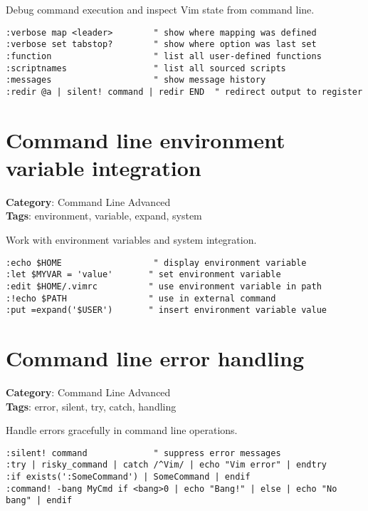 {{{{Debug command execution and inspect Vim state from command line.

\begin{Exa*}{}
\begin{Verbatim}[fontsize=\footnotesize, breaklines, breakanywhere]
:verbose map <leader>        " show where mapping was defined
:verbose set tabstop?        " show where option was last set
:function                    " list all user-defined functions
:scriptnames                 " list all sourced scripts
:messages                    " show message history
:redir @a | silent! command | redir END  " redirect output to register
\end{Verbatim}
\end{Exa*}

\section{Command line environment variable integration}

\textbf{Category}: Command Line Advanced\\ \textbf{Tags}: environment, variable, expand, system
\vspace{0.5cm}

Work with environment variables and system integration.

\begin{Exa*}{}
\begin{Verbatim}[fontsize=\footnotesize, breaklines, breakanywhere]
:echo $HOME                  " display environment variable
:let $MYVAR = 'value'       " set environment variable
:edit $HOME/.vimrc          " use environment variable in path
:!echo $PATH                " use in external command
:put =expand('$USER')       " insert environment variable value
\end{Verbatim}
\end{Exa*}

\section{Command line error handling}

\textbf{Category}: Command Line Advanced\\ \textbf{Tags}: error, silent, try, catch, handling
\vspace{0.5cm}

Handle errors gracefully in command line operations.

\begin{Exa*}{}
\begin{Verbatim}[fontsize=\footnotesize, breaklines, breakanywhere]
:silent! command             " suppress error messages
:try | risky_command | catch /^Vim/ | echo "Vim error" | endtry
:if exists(':SomeCommand') | SomeCommand | endif
:command! -bang MyCmd if <bang>0 | echo "Bang!" | else | echo "No bang" | endif
\end{Verbatim}
\end{Exa*}

}}}}
